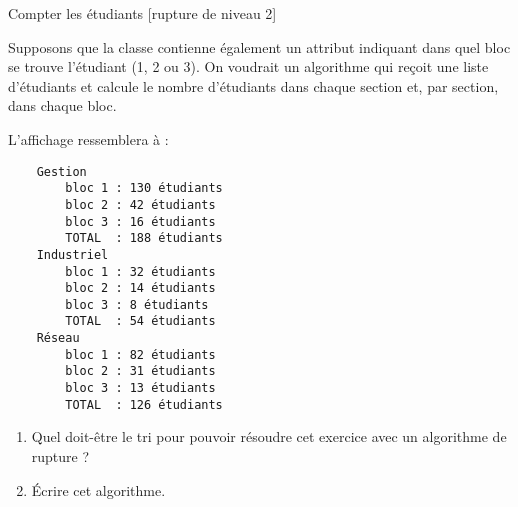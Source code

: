 \begin{Exercice}{Compter les étudiants [rupture de niveau 2]}
	
	Supposons que la classe  contienne également
	un attribut indiquant dans quel bloc se trouve l'étudiant (1, 2 ou 3).
	On voudrait un algorithme qui reçoit une liste d'étudiants et calcule
	le nombre d'étudiants dans chaque section et, par section, dans chaque bloc.
	
	L'affichage ressemblera à :
	{\footnotesize
	\begin{verbatim}
    Gestion
        bloc 1 : 130 étudiants
        bloc 2 : 42 étudiants
        bloc 3 : 16 étudiants
        TOTAL  : 188 étudiants
    Industriel
        bloc 1 : 32 étudiants
        bloc 2 : 14 étudiants
        bloc 3 : 8 étudiants
        TOTAL  : 54 étudiants
    Réseau
        bloc 1 : 82 étudiants
        bloc 2 : 31 étudiants
        bloc 3 : 13 étudiants
        TOTAL  : 126 étudiants
	\end{verbatim}
	}
	\begin{enumerate}[label=\alph*)]
		\item 
		Quel doit-être le tri pour pouvoir résoudre cet exercice
		avec un algorithme de rupture ?
		\item 
		Écrire cet algorithme.
	\end{enumerate}
\end{Exercice}

\begin{Solution}
  \begin{algo}


\end{algo}

\end{Solution}
	
